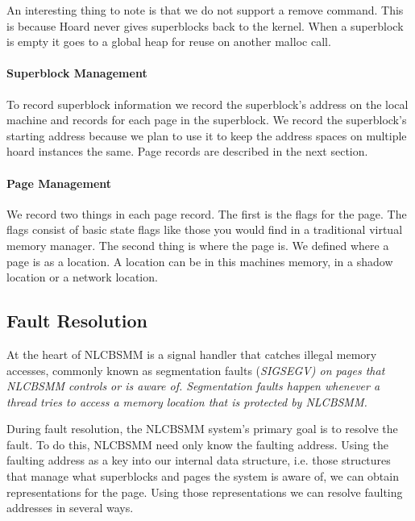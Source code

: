 \documentclass[9pt]{sig-alternate-10pt}
\begin{document}
An interesting thing to note is that we do not support a remove command. This is because Hoard never gives superblocks back to the kernel. When a superblock is empty it goes to a global heap for reuse on another malloc call.

\paragraph{Superblock Management}
To record superblock information we record the superblock's address on the local machine and records for each page in the superblock. We record the superblock's starting address because we plan to use it to keep the address spaces on multiple hoard instances the same. Page records are described in the next section.

\paragraph{Page Management}
We record two things in each page record. The first is the flags for the page. The flags consist of basic state flags like those you would find in a traditional virtual memory manager. The second thing is where the page is. We defined where a page is as a location. A location can be in this machines memory, in a shadow location or a network location. 



\subsection{Fault Resolution}
\label{fault_resolution}
At the heart of NLCBSMM is a signal handler that catches illegal memory accesses, commonly known as segmentation faults (\em SIGSEGV\em) on pages that NLCBSMM controls or is aware of. Segmentation faults happen whenever a thread tries to access a memory location that is protected by NLCBSMM. 
 
During fault resolution, the NLCBSMM system's primary goal is to resolve the fault.  To do this, NLCBSMM need only know the faulting address.  Using the faulting address as a key into our internal data structure, i.e. those structures that manage what superblocks and pages the system is aware of, we can obtain representations for the page.  Using those representations we can resolve faulting addresses in several ways. 
\end{document}
